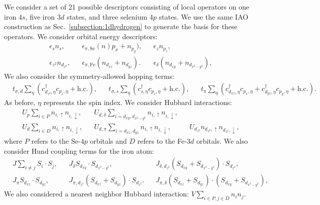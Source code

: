 We consider a set of 21 possible descriptors consisting of local operators on one iron $4s$, five iron $3d$ states, and three selenium $4p$ states.
We use the same IAO construction as Sec.~\ref{subsection:1dhydrogen} to generate the basis for these operators.
We consider orbital energy descriptors: 
\begin{align*}
  &\epsilon_{s} n_s,&
  &\epsilon_{\pi,\mathrm{Se}} (n){p_x} + n_{p_y}), &
  &\epsilon_{z} n_{p_z},&
  \\
  &\epsilon_{z^2} n_{d_{z^2}},& 
  &\epsilon_{\pi,\mathrm{Fe}} (n_{d_{xz}} + n_{d_{yz}}).& 
  &\epsilon_{\delta} (n_{d_{xy}} + n_{d_{x^2-y^2}}),&
\end{align*}
We also consider the symmetry-allowed hopping terms:
\begin{align*}
  &t_{\sigma,d} \sum_{\eta} \left( c_{d_{z^2},\eta}^{\dagger} c_{p_z,\eta} + \text{h.c.} \right),&
  &t_{\sigma,s} \sum_{\eta} \left(c_{s,\eta}^{\dagger}  c_{p_z,\eta} + \text{h.c.} \right),&
  &t_{\pi} \sum_{\eta} \left(c_{d_{xz},\eta}^{\dagger}  c_{p_x,\eta} + c_{d_{yz},\eta}^{\dagger}  c_{p_y,\eta} + \text{h.c.} \right).&
\end{align*}
As before, $\eta$ represents the spin index.
We consider Hubbard interactions:
\begin{align*}
  &U_p \sum_{i \in P} n_{i,\uparrow} n_{i,\downarrow},&
  &U_{d,\delta} \sum_{i=d_{xy},d_{x^2-y^2}} n_{i,\uparrow} n_{i,\downarrow},&
  \\
  &U_d \sum_{i \in D} n_{i,\uparrow} n_{i,\downarrow},&
  &U_{d,\pi} \sum_{i=d_{xz},d_{yz}} n_{i,\uparrow} n_{i,\downarrow},&
  &U_{d_{z^2}} n_{d_{z^2},\uparrow} n_{d_{z^2},\downarrow},&
\end{align*}
where $P$ refers to the Se-$4p$ orbitals and $D$ refers to the Fe-$3d$ orbitals. 
We also consider Hund coupling terms for the iron atom:
\begin{align*}
  &J \sum_{i\ne j} S_i \cdot S_j,&
  &J_{\delta} S_{d_{xy}} \cdot S_{d_{x^2-y^2}},&
  &J_{\delta,d_{z^2}} (S_{d_{xy}} + S_{d_{x^2-y^2}}) \cdot S_{d_{z^2}},&
  \\
  &J_{\pi} S_{d_{xz}} \cdot S_{d_{yz}},&
  &J_{\pi,d_{z^2}} (S_{d_{xz}} + S_{d_{yz}}) \cdot S_{d_{z^2}}.&
  &J_{\pi,\delta} (S_{d_{xz}} + S_{d_{yz}}) \cdot (S_{d_{xy}} + S_{d_{x^2-y^2}}),&
\end{align*}
We also considered a nearest neighbor Hubbard interaction: $V \sum_{i\in P, j\in D} n_{i} n_j$.

